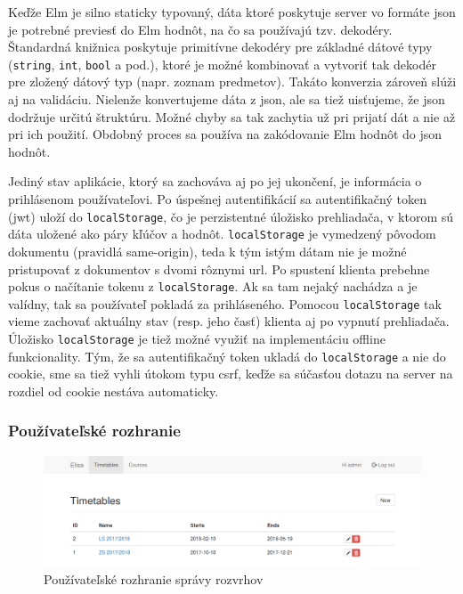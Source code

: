 Keďže Elm je silno staticky typovaný, dáta ktoré poskytuje server vo formáte
\acrshort{json} je potrebné previesť do Elm hodnôt, na čo sa používajú tzv.
dekodéry. Štandardná knižnica poskytuje primitívne dekodéry pre základné dátové
typy (\texttt{string}, \texttt{int}, \texttt{bool} a pod.), ktoré je možné
kombinovať a vytvoriť tak dekodér pre zložený dátový typ (napr. zoznam
predmetov). Takáto konverzia zároveň slúži aj na validáciu. Nielenže
konvertujeme dáta z \acrshort{json}, ale sa tiež uisťujeme, že \acrshort{json}
dodržuje určitú štruktúru. Možné chyby sa tak zachytia už pri prijatí dát a nie
až pri ich použití. Obdobný proces sa používa na zakódovanie Elm hodnôt do
\acrshort{json} hodnôt.

Jediný stav aplikácie, ktorý sa zachováva aj po jej ukončení, je informácia o
prihlásenom používateľovi. Po úspešnej autentifikácií sa autentifikačný token
(\acrshort{jwt}) uloží do \texttt{localStorage}, čo je perzistentné úložisko
prehliadača, v ktorom sú dáta uložené ako páry kľúčov a hodnôt.
\texttt{localStorage} je vymedzený pôvodom dokumentu (pravidlá same-origin),
teda k tým istým dátam nie je možné pristupovať z dokumentov s dvomi rôznymi
\acrshort{url}. \cite{flanagan} Po spustení klienta prebehne pokus o načítanie
tokenu z \texttt{localStorage}. Ak sa tam nejaký nachádza a je valídny, tak sa
používateľ pokladá za prihláseného. Pomocou \texttt{localStorage} tak vieme
zachovať aktuálny stav (resp. jeho časť) klienta aj po vypnutí prehliadača.
Úložisko \texttt{localStorage} je tiež možné využiť na implementáciu offline
funkcionality. Tým, že sa autentifikačný token ukladá do \texttt{localStorage} a
nie do cookie, sme sa tiež vyhli útokom typu \acrfull{csrf}, keďže sa súčasťou
dotazu na server na rozdiel od cookie nestáva automaticky.

\subsubsection{Používateľské rozhranie}

\begin{figure}
  \centering
  \includegraphics[width=\textwidth]{figures/client-timetables.png}
  \caption{\label{fig:client_timetables} Používateľské rozhranie správy
    rozvrhov}
\end{figure}

